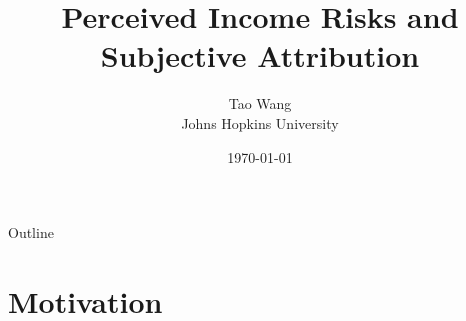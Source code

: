 \documentclass{beamer}
\title{Perceived Income Risks and Subjective Attribution}
\author{Tao Wang \\ Johns Hopkins University}
\date{\today}
\begin{document}
	

\begin{frame}
	\titlepage
\end{frame}
\begin{frame}{Outline}
	\tableofcontents
\end{frame}


\section{Motivation}

\end{document}
